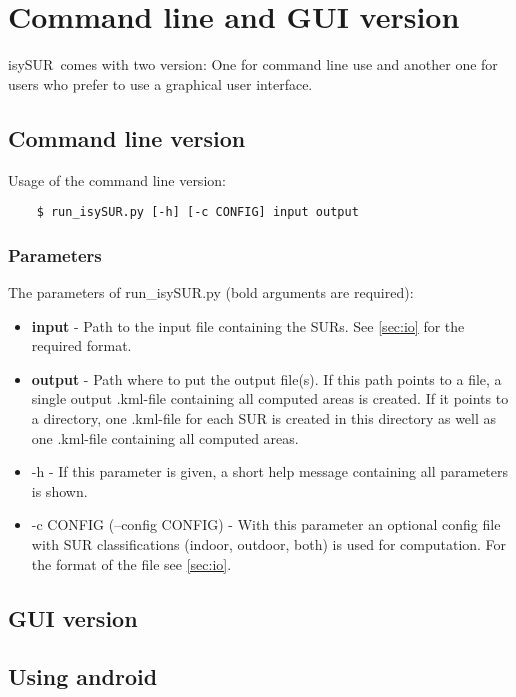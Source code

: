 \documentclass[11pt,fleqn]{book} %
\newcommand{\todol}{\todo[inline]} %
\newcommand{\ProjectTitle}{isySUR}
\newcommand{\pt}{\ProjectTitle}
\begin{document}
\section{Command line and GUI version}\label{sec:usage}
\pt\ comes with two version: One for command line use and another one for users who prefer to use a graphical user interface.

\subsection{Command line version}
Usage of the command line version:
\begin{verbatim}
	$ run_isySUR.py [-h] [-c CONFIG] input output
\end{verbatim}

\subsubsection{Parameters}
\todol{up to date?}
The parameters of run\_isySUR.py (bold arguments are required):
\begin{itemize}
	\item \textbf{input} - Path to the input file containing the SURs. See \ref{sec:io} for the required format.
	\item \textbf{output} - Path where to put the output file(s). If this path points to a file, a single output .kml-file containing all computed areas is created. If it points to a directory, one .kml-file for each SUR is created in this directory as well as one .kml-file containing all computed areas.
	\item -h - If this parameter is given, a short help message containing all parameters is shown.
	\item -c CONFIG (--config CONFIG) - With this parameter an optional config file with SUR classifications (indoor, outdoor, both) is used for computation. For the format of the file see \ref{sec:io}.
\end{itemize}

\subsection{GUI version}
\todol{fill me!}

\subsection{Using android}\label{sec:android}
\todol{fill me!}
\end{document}

